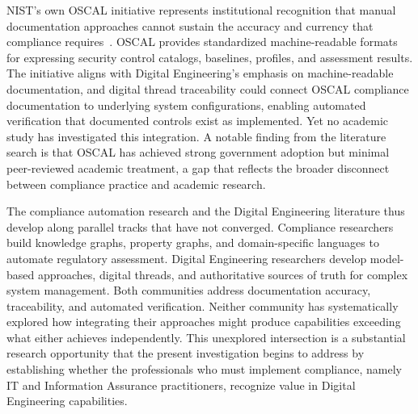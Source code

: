 NIST's own OSCAL initiative represents institutional recognition that manual documentation approaches cannot sustain the accuracy and currency that compliance requires~\parencite{NIST_OSCAL_2023}. OSCAL provides standardized machine-readable formats for expressing security control catalogs, baselines, profiles, and assessment results. The initiative aligns with Digital Engineering's emphasis on machine-readable documentation, and digital thread traceability could connect OSCAL compliance documentation to underlying system configurations, enabling automated verification that documented controls exist as implemented. Yet no academic study has investigated this integration. A notable finding from the literature search is that OSCAL has achieved strong government adoption but minimal peer-reviewed academic treatment, a gap that reflects the broader disconnect between compliance practice and academic research.

The compliance automation research and the Digital Engineering literature thus develop along parallel tracks that have not converged. Compliance researchers build knowledge graphs, property graphs, and domain-specific languages to automate regulatory assessment. Digital Engineering researchers develop model-based approaches, digital threads, and authoritative sources of truth for complex system management. Both communities address documentation accuracy, traceability, and automated verification. Neither community has systematically explored how integrating their approaches might produce capabilities exceeding what either achieves independently. This unexplored intersection is a substantial research opportunity that the present investigation begins to address by establishing whether the professionals who must implement compliance, namely IT and Information Assurance practitioners, recognize value in Digital Engineering capabilities.

